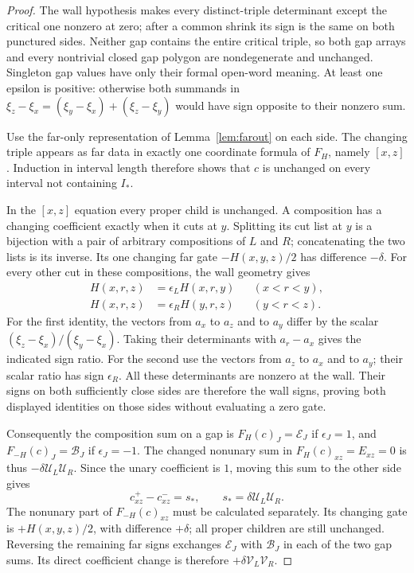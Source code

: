 \begin{proof}\leanok{}
The wall hypothesis makes every distinct-triple determinant except the
critical one nonzero at zero; after a common shrink its sign is the
same on both punctured sides. Neither gap contains the entire critical
triple, so both gap arrays and every nontrivial closed gap polygon are
nondegenerate and unchanged. Singleton gap values have only their formal
open-word meaning. At least one epsilon is positive: otherwise both
summands in $\xi_z-\xi_x=(\xi_y-\xi_x)+(\xi_z-\xi_y)$ would have
sign opposite to their nonzero sum.

Use the far-only representation of Lemma~\ref{lem:farout} on each side.
The changing triple appears as far data in exactly one coordinate formula
of $F_H$, namely $[x,z]$.  Induction in interval length therefore shows
that $c$ is unchanged on every interval not containing $I_*$.

In the $[x,z]$ equation every proper child is unchanged.  A composition
has a changing coefficient exactly when it cuts at $y$.  Splitting its
cut list at $y$ is a bijection with a pair of arbitrary compositions of
$L$ and $R$; concatenating the two lists is its inverse.  Its one
changing far gate $-H(x,y,z)/2$ has difference $-\delta$.
For every other cut in these compositions, the wall geometry gives
\begin{align}
 H(x,r,z)&=\epsilon_L H(x,r,y) &&(x<r<y),\label{afr:wall-left-sign}\\
 H(x,r,z)&=\epsilon_R H(y,r,z) &&(y<r<z).\label{afr:wall-right-sign}
\end{align}
For the first identity, the vectors from $a_x$ to $a_z$ and to $a_y$
differ by the scalar $(\xi_z-\xi_x)/(\xi_y-\xi_x)$.
Taking their determinants with $a_r-a_x$ gives the indicated sign ratio.
For the second use the vectors from $a_z$ to $a_x$ and to $a_y$;
their scalar ratio has sign $\epsilon_R$.  All these determinants are
nonzero at the wall.  Their signs on both sufficiently close sides are
therefore the wall signs, proving both displayed identities on those
sides without evaluating a zero gate.

Consequently the composition sum on a gap is $F_H(c)_J=\mathcal E_J$ if
$\epsilon_J=1$, and $F_{-H}(c)_J=\mathcal B_J$ if $\epsilon_J=-1$.
The changed nonunary sum in $F_H(c)_{xz}=E_{xz}=0$ is thus
$-\delta \mathcal U_L\mathcal U_R$.  Since the unary coefficient is $1$, moving this
sum to the other side gives
\begin{equation}\label{afr:wall-source}
 c^+_{xz}-c^-_{xz}=s_*,
 \qquad s_*=\delta \mathcal U_L\mathcal U_R.
\end{equation}
The nonunary part of $F_{-H}(c)_{xz}$ must be calculated separately.
Its changing gate is $+H(x,y,z)/2$, with difference $+\delta$;
all proper children are still unchanged.  Reversing the remaining far
signs exchanges $\mathcal E_J$ with $\mathcal B_J$ in each of the two gap sums.
Its direct coefficient change is therefore $+\delta \mathcal V_L\mathcal V_R$.


\end{proof}
